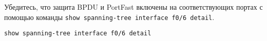 Убедитесь, что защита BPDU и PortFast включены на соответствующих портах
с помощью команды \texttt{show spanning-tree interface f0/6 detail}.

\begin{verbatim}
show spanning-tree interface f0/6 detail
\end{verbatim}






